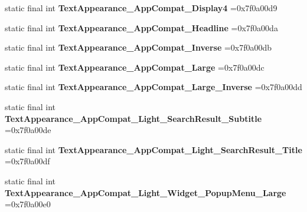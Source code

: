 \begin{DoxyCompactItemize}
\mbox{\label{classproject4_1_1xaria_1_1R_1_1style_a9206170d23f529ae671c7000f47b481a}} 
static final int {\bfseries Text\+Appearance\+\_\+\+App\+Compat\+\_\+\+Display4} =0x7f0a00d9
\item 
\mbox{\label{classproject4_1_1xaria_1_1R_1_1style_afedaf075fbd69aa884bd024719a84dbe}} 
static final int {\bfseries Text\+Appearance\+\_\+\+App\+Compat\+\_\+\+Headline} =0x7f0a00da
\item 
\mbox{\label{classproject4_1_1xaria_1_1R_1_1style_a5f1afdcab277f4212d8989e1a4530336}} 
static final int {\bfseries Text\+Appearance\+\_\+\+App\+Compat\+\_\+\+Inverse} =0x7f0a00db
\item 
\mbox{\label{classproject4_1_1xaria_1_1R_1_1style_afc0d96bb3744a630d21790df91a11756}} 
static final int {\bfseries Text\+Appearance\+\_\+\+App\+Compat\+\_\+\+Large} =0x7f0a00dc
\item 
\mbox{\label{classproject4_1_1xaria_1_1R_1_1style_a8e25c650795dd0feab1fee3a78779b57}} 
static final int {\bfseries Text\+Appearance\+\_\+\+App\+Compat\+\_\+\+Large\+\_\+\+Inverse} =0x7f0a00dd
\item 
\mbox{\label{classproject4_1_1xaria_1_1R_1_1style_aa3b82ebe53bee00739f031a3aebe56af}} 
static final int {\bfseries Text\+Appearance\+\_\+\+App\+Compat\+\_\+\+Light\+\_\+\+Search\+Result\+\_\+\+Subtitle} =0x7f0a00de
\item 
\mbox{\label{classproject4_1_1xaria_1_1R_1_1style_a6704deddbdacfb91fa4e57a555b0c946}} 
static final int {\bfseries Text\+Appearance\+\_\+\+App\+Compat\+\_\+\+Light\+\_\+\+Search\+Result\+\_\+\+Title} =0x7f0a00df
\item 
\mbox{\label{classproject4_1_1xaria_1_1R_1_1style_a448b03adc0a6469ce8b01360e88039f7}} 
static final int {\bfseries Text\+Appearance\+\_\+\+App\+Compat\+\_\+\+Light\+\_\+\+Widget\+\_\+\+Popup\+Menu\+\_\+\+Large} =0x7f0a00e0
\item 

\end{DoxyCompactItemize}
